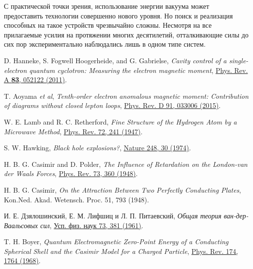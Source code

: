 \documentclass[a4paper, 12pt]{article}
\def\bibauthor#1{#1} %
\def\bibtitle#1{\textit{#1}} %
\begin{document}
С практической точки зрения, использование энергии вакуума может предоставить технологии совершенно нового уровня. Но поиск и реализация способных на такое устройств чрезвычайно сложны. Несмотря на все прилагаемые усилия на протяжении многих десятилетий, отталкивающие силы до сих пор экспериментально наблюдались лишь в одном типе систем. 





\begin{thebibliography}{99}
	\bibauthor{D. Hanneke, S. Fogwell Hoogerheide, and G. Gabrielse}, 
	\bibtitle{Cavity control of a single-electron quantum cyclotron: Measuring the electron magnetic moment}, 
	\href{http://dx.doi.org/10.1103/PhysRevA.83.052122}{Phys. Rev. A \textbf{83}, 052122 (2011)}.

	\bibauthor{T. Aoyama \textit{et al}},
	\bibtitle{Tenth-order electron anomalous magnetic moment: Contribution
of diagrams without closed lepton loops}, 
	\href{http://dx.doi.org/10.1103/PhysRevD.91.033006}{Phys. Rev. D 91, 033006 (2015)}.

	\bibauthor{W. E. Lamb and R. C. Retherford}, 
	\bibtitle{Fine Structure of the Hydrogen Atom by a Microwave Method}, 
	\href{http://dx.doi.org/10.1103/PhysRev.72.241}{Phys. Rev. 72, 241 (1947)}.

	\bibauthor{S. W. Hawking}, 
	\bibtitle{Black hole explosions?}, 
	\href{http://dx.doi.org/10.1038/248030a0}{Nature 248, 30 (1974)}.

	\bibauthor{H. B. G. Casimir and D. Polder}, 
	\bibtitle{The Influence of Retardation on the London-van der Waals Forces}, 
	\href{http://dx.doi.org/10.1103/PhysRev.73.360}{Phys. Rev. 73, 360 (1948)}.

	\bibauthor{H. B. G. Casimir}, 
	\bibtitle{On the Attraction Between Two Perfectly Conducting Plates}, 
	Kon.Ned. Akad. Wetensch. Proc. 51, 793 (1948).

	\bibauthor{И. Е. Дзялошинский, Е. М. Лифшиц и Л. П. Питаевский}, 
	\bibtitle{Общая теория ван-дер-Ваальсовых сил}, 
	\href{http://dx.doi.org/10.3367/UFNr.0073.196103b.0381}{Усп. физ. наук 73, 381 (1961)}.

	\bibauthor{T. H. Boyer}, 
	\bibtitle{Quantum Electromagnetic Zero-Point Energy of a Conducting Spherical Shell and the Casimir Model for a Charged Particle}, 
	\href{http://dx.doi.org/10.1103/PhysRev.174.1764}{Phys. Rev. 174, 1764 (1968)}.


\end{thebibliography}
\end{document}
